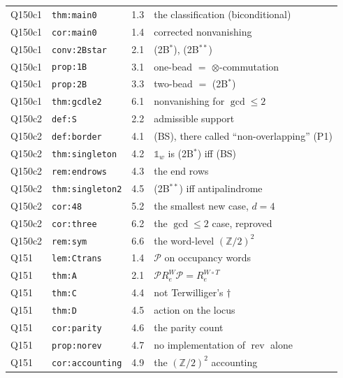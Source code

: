 \documentclass[11pt]{article}
\theoremstyle{definition}
\theoremstyle{remark}
\newcommand{\rev}{\operatorname{rev}}
\begin{document}
\begin{longtable}{@{}llll@{}}
Q150c1 & \texttt{thm:main0} & 1.3 & the classification (biconditional)\\
Q150c1 & \texttt{cor:main0} & 1.4 & corrected nonvanishing\\
Q150c1 & \texttt{conv:2Bstar} & 2.1 & (2B$^{*}$), (2B$^{**}$)\\
Q150c1 & \texttt{prop:1B} & 3.1 & one-bead $=$ $\otimes$-commutation\\
Q150c1 & \texttt{prop:2B} & 3.3 & two-bead $=$ (2B$^{*}$)\\
Q150c1 & \texttt{thm:gcdle2} & 6.1 & nonvanishing for $\gcd\le2$\\
Q150c2 & \texttt{def:S} & 2.2 & admissible support\\
Q150c2 & \texttt{def:border} & 4.1 & (BS), there called ``non-overlapping'' (P1)\\
Q150c2 & \texttt{thm:singleton} & 4.2 & $\mathbb{1}_w$ is (2B$^{*}$) iff (BS)\\
Q150c2 & \texttt{rem:endrows} & 4.3 & the end rows\\
Q150c2 & \texttt{thm:singleton2} & 4.5 & (2B$^{**}$) iff antipalindrome\\
Q150c2 & \texttt{cor:48} & 5.2 & the smallest new case, $d=4$\\
Q150c2 & \texttt{cor:three} & 6.2 & the $\gcd\le2$ case, reproved\\
Q150c2 & \texttt{rem:sym} & 6.6 & the word-level $(\mathbb{Z}/2)^2$\\
Q151 & \texttt{lem:Ctrans} & 1.4 & $\mathcal{P}$ on occupancy words\\
Q151 & \texttt{thm:A} & 2.1 & $\mathcal{P}R_e^{W}\mathcal{P}=R_e^{W\circ T}$\\
Q151 & \texttt{thm:C} & 4.4 & not Terwilliger's $\dagger$\\
Q151 & \texttt{thm:D} & 4.5 & action on the locus\\
Q151 & \texttt{cor:parity} & 4.6 & the parity count\\
Q151 & \texttt{prop:norev} & 4.7 & no implementation of $\rev$ alone\\
Q151 & \texttt{cor:accounting} & 4.9 & the $(\mathbb{Z}/2)^2$ accounting\\
\hline
\end{longtable}
\end{document}

